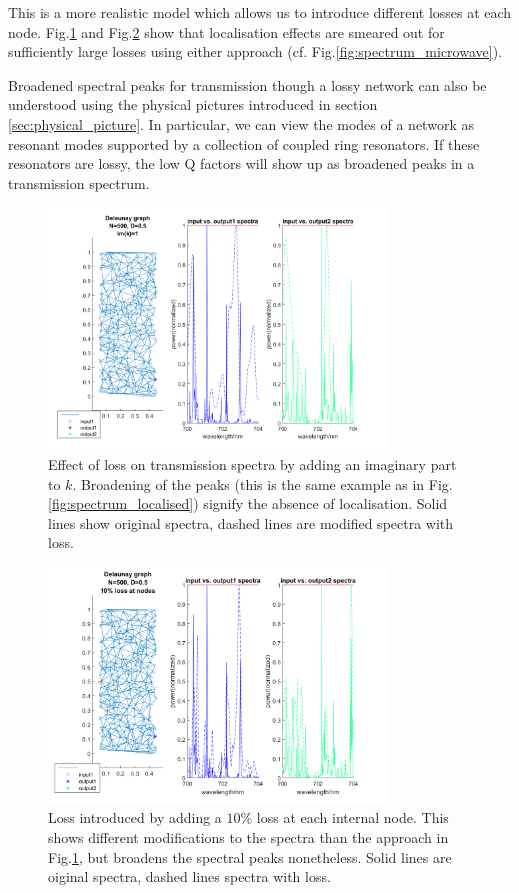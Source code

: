 This is a more realistic model which allows us to introduce different losses at each node. Fig.\ref{fig:edge_loss} and Fig.\ref{fig:node_loss} show that localisation effects are smeared out for sufficiently large losses using either approach (cf. Fig.\ref{fig:spectrum_microwave}).

Broadened spectral peaks for transmission though a lossy network can also be understood using the physical pictures introduced in section \ref{sec:physical_picture}. In particular, we can view the modes of a network as resonant modes supported by a collection of coupled ring resonators. If these resonators are lossy, the low Q factors will show up as broadened peaks in a transmission spectrum.

\begin{figure}[htp]
  \centering
    \includegraphics[width=0.8\textwidth]{ch3/fig3/edge_loss.png}
    \caption{Effect of loss on transmission spectra by adding an imaginary part to $k$. Broadening of the peaks (this is the same example as in Fig.\ref{fig:spectrum_localised}) signify the absence of localisation. Solid lines show original spectra, dashed lines are modified spectra with loss.} 
    \label{fig:edge_loss}
\end{figure}

\begin{figure}[hbp]
  \centering
    \includegraphics[width=0.8\textwidth]{ch3/fig3/node_loss.png}
    \caption{Loss introduced by adding a $10\%$ loss at each internal node. This shows different modifications to the spectra than the approach in Fig.\ref{fig:edge_loss}, but broadens the spectral peaks nonetheless. Solid lines are oiginal spectra, dashed lines spectra with loss.} 
    \label{fig:node_loss}
\end{figure}


